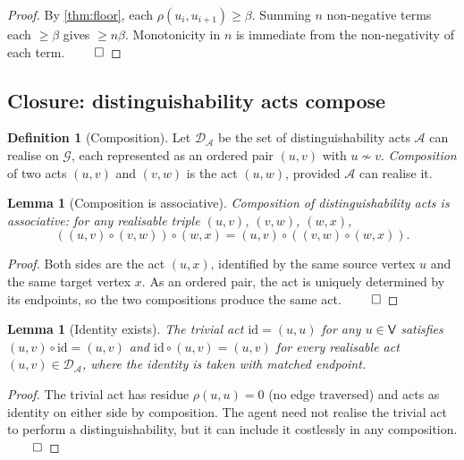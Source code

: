 \documentclass[11pt,a4paper]{article}
\theoremstyle{thmstyle}
\newtheorem{lemma}[theorem]{Lemma}
\theoremstyle{definition}
\newtheorem{definition}[theorem]{Definition}
\theoremstyle{remark}
\newcommand{\Graph}{\mathcal{G}}
\newcommand{\Vrt}{\mathsf{V}}
\newcommand{\Agent}{\mathcal{A}}
\newcommand{\Res}{\rho}
\newcommand{\floor}{\beta}
\begin{document}
\begin{proof}
By \cref{thm:floor}, each $\Res(u_i, u_{i+1}) \geq \floor$. Summing
$n$ non-negative terms each $\geq \floor$ gives $\geq n\floor$.
Monotonicity in $n$ is immediate from the non-negativity of each
term. $\qed$
\end{proof}

\subsection{Closure: distinguishability acts compose}

\begin{definition}[Composition]
\label{def:compose}
Let $\mathcal{D}_\Agent$ be the set of distinguishability acts
$\Agent$ can realise on $\Graph$, each represented as an ordered
pair $(u, v)$ with $u \not\sim v$. \emph{Composition} of two acts
$(u, v)$ and $(v, w)$ is the act $(u, w)$, provided $\Agent$ can
realise it.
\end{definition}

\begin{lemma}[Composition is associative]
\label{lem:assoc}
Composition of distinguishability acts is associative: for any
realisable triple $(u, v)$, $(v, w)$, $(w, x)$,
\[
  ((u,v)\circ(v,w))\circ(w,x) = (u,v)\circ((v,w)\circ(w,x)).
\]
\end{lemma}

\begin{proof}
Both sides are the act $(u, x)$, identified by the same source
vertex $u$ and the same target vertex $x$. As an ordered pair, the
act is uniquely determined by its endpoints, so the two
compositions produce the same act. $\qed$
\end{proof}

\begin{lemma}[Identity exists]
\label{lem:identity}
The \emph{trivial act} $\mathrm{id} = (u, u)$ for any $u \in \Vrt$
satisfies $(u, v) \circ \mathrm{id} = (u, v)$ and
$\mathrm{id} \circ (u, v) = (u, v)$ for every realisable act
$(u, v) \in \mathcal{D}_\Agent$, where the identity is taken with
matched endpoint.
\end{lemma}

\begin{proof}
The trivial act has residue $\Res(u, u) = 0$ (no edge traversed)
and acts as identity on either side by composition. The agent need
not realise the trivial act to perform a distinguishability, but it
can include it costlessly in any composition. $\qed$
\end{proof}
\end{document}

